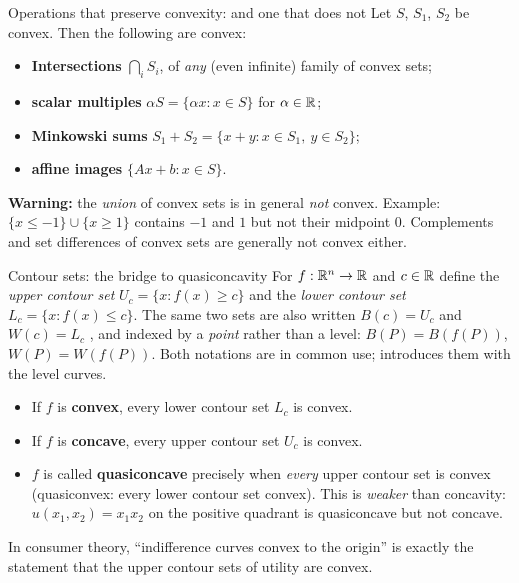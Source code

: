 \begin{rulebox}{Operations that preserve convexity: and one that does not}
Let $S$, $S_{1}$, $S_{2}$ be convex. Then the following are convex:
\begin{itemize}[leftmargin=1.6em,itemsep=0.3ex]
  \item \textbf{Intersections} $\bigcap_{i}S_{i}$, of \emph{any} (even
        infinite) family of convex sets;
  \item \textbf{scalar multiples} $\alpha S=\{\alpha x : x\in S\}$ for
        $\alpha\in\mathbb{R}$;
  \item \textbf{Minkowski sums} $S_{1}+S_{2}=\{x+y : x\in S_{1},\ y\in
        S_{2}\}$;
  \item \textbf{affine images} $\{Ax+b : x\in S\}$.
\end{itemize}
\textbf{Warning:} the \emph{union} of convex sets is in general \emph{not}
convex. Example: $\{x\le -1\}\cup\{x\ge 1\}$ contains $-1$ and $1$ but not
their midpoint $0$. Complements and set differences of convex sets are
generally not convex either.
\end{rulebox}

\begin{rulebox}{Contour sets: the bridge to quasiconcavity}
For $f:\mathbb{R}^{n}\to\mathbb{R}$ and $c\in\mathbb{R}$ define the \emph{upper contour set}
$U_{c}=\{x: f(x)\ge c\}$ and the \emph{lower contour set}
$L_{c}=\{x: f(x)\le c\}$. The same two sets are also written
$B(c)=U_{c}$  and
$W(c)=L_{c}$ , and indexed by a
\emph{point} rather than a level: $B(P)=B(f(P))$, $W(P)=W(f(P))$. Both
notations are in common use;  introduces them with
the level curves.
\begin{itemize}[leftmargin=1.6em,itemsep=0.3ex]
  \item If $f$ is \textbf{convex}, every lower contour set $L_{c}$ is
        convex.
  \item If $f$ is \textbf{concave}, every upper contour set $U_{c}$ is
        convex.
  \item $f$ is called \textbf{quasiconcave} precisely when \emph{every}
        upper contour set is convex (quasiconvex: every lower contour set
        convex). This is \emph{weaker} than concavity: $u(x_{1},x_{2})
        =x_{1}x_{2}$ on the positive quadrant is quasiconcave but not
        concave.
\end{itemize}
In consumer theory, ``indifference curves convex to the origin'' is exactly
the statement that the upper contour sets of utility are convex.
\end{rulebox}

